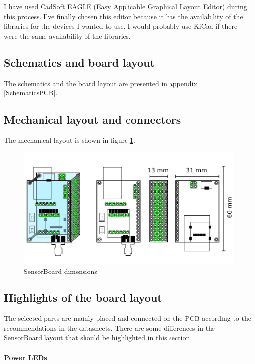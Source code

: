 I have used CadSoft EAGLE (Easy Applicable Graphical Layout Editor) \cite{EAGLE} during this process. I've finally chosen this editor because it has the availability of the libraries for the devices I wanted to use. I would probably use KiCad \cite{KiCad} if there were the same availability of the libraries.

\subsection{Schematics and board layout}
The schematics and the board layout are presented in appendix \ref{SchematicsPCB}.

\subsection{Mechanical layout and connectors}
The mechanical layout is shown in figure \ref{fig:HWdimensions}.

\begin{figure}
    \centering
    \label{fig:HWdimensions}
    \caption{SensorBoard dimensions}
    \includegraphics[scale=1]{img/HWdimensions.pdf}
\end{figure}

\subsection{Highlights of the board layout}
The selected parts are mainly placed and connected on the \ac{PCB} according to the recommendations in the datasheets. There are some differences in the SensorBoard layout that should be highlighted in this section.

\paragraph{Power LEDs}

